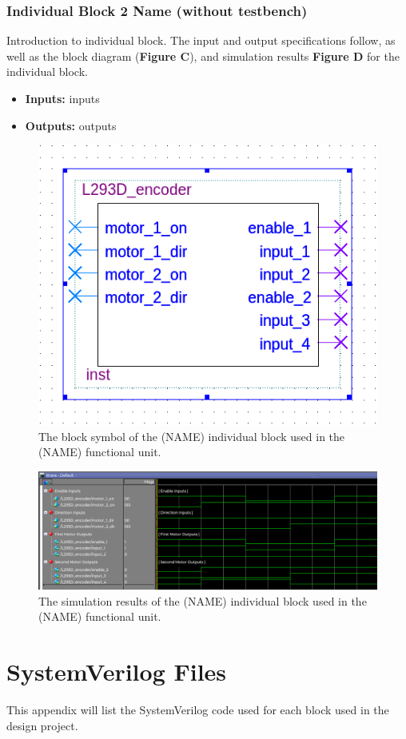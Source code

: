 \documentclass[a4paper]{article}
\begin{document}
\subsubsection{Individual Block 2 Name (without testbench)}
Introduction to individual block. The input and output specifications follow, as well as the block diagram (\textbf{Figure C}), and simulation results \textbf{Figure D} for the individual block.
\begin{itemize}
  \item \textbf{Inputs:  } inputs
  \item \textbf{Outputs: } outputs
\end{itemize}
\begin{figure}[h]
  \centering
  \includegraphics[width=.48\textwidth]{symbols/individual_placeholder.png}
  \caption{The block symbol of the (NAME) individual block used in the (NAME) functional unit.}
    \label{fig:individual-1-2-block}
\end{figure}
\begin{figure}[h]
  \centering
  \includegraphics[width=.98\textwidth]{sims/placeholder_sim.png}
  \caption{The simulation results of the (NAME) individual block used in the (NAME) functional unit.}
    \label{fig:individual-1-2-sim}
\end{figure}



\clearpage



\appendix
\section{SystemVerilog Files}
This appendix will list the SystemVerilog code used for each block used in the design project.
\end{document}
